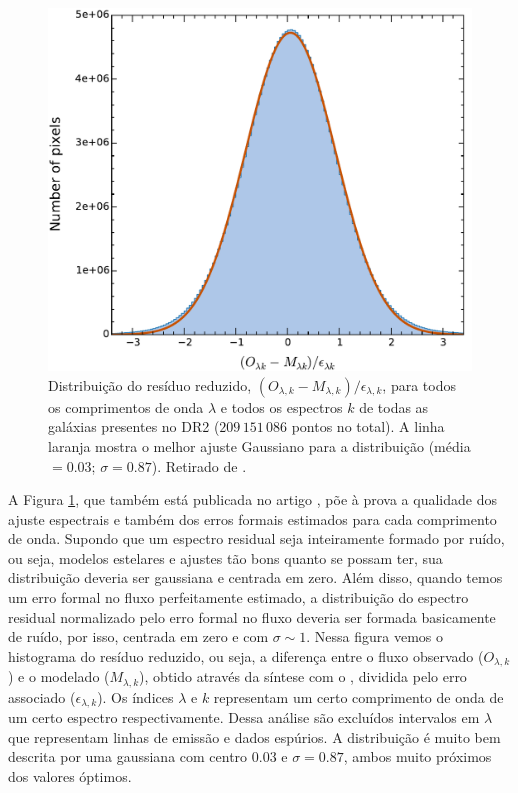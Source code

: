 \begin{figure}
	\centering
	\includegraphics[scale=0.4]{figuras/DR2_hist_error.pdf}
	\caption[Distribuição dos resíduos reduzidos.]
	{Distribuição do resíduo reduzido, $(O_{\lambda,k} - M_{\lambda,k})/\epsilon_{\lambda,k}$, para todos os comprimentos de onda $\lambda$ e todos os espectros $k$ de todas as galáxias presentes no DR2 ($209\,151\,086$ pontos no total). A linha laranja mostra o melhor ajuste Gaussiano para a distribuição (média $= 0.03$; $\sigma = 0.87$). Retirado de \citet{GarciaBenito.etal.2015a}.}
	\label{fig:fres_norm_error_distrib}
\end{figure}

A Figura \ref{fig:fres_norm_error_distrib}, que também está publicada no artigo \citet{GarciaBenito.etal.2015a}, põe à prova a qualidade dos ajuste espectrais e também dos erros formais estimados para cada comprimento de onda. Supondo que um espectro residual seja inteiramente formado por ruído, ou seja, modelos estelares e ajustes tão bons quanto se possam ter, sua distribuição deveria ser gaussiana e centrada em zero. Além disso, quando temos um erro formal no fluxo perfeitamente estimado, a distribuição do espectro residual normalizado pelo erro formal no fluxo deveria ser formada basicamente de ruído, por isso, centrada em zero e com $\sigma \sim 1$. Nessa figura vemos o histograma do resíduo reduzido, ou seja, a diferença entre o fluxo observado ($O_{\lambda,k}$) e o modelado ($M_{\lambda,k}$), obtido através da síntese com o \starlight, dividida pelo erro associado ($\epsilon_{\lambda,k}$). Os índices $\lambda$ e $k$ representam um certo comprimento de onda de um certo espectro respectivamente. Dessa análise são excluídos intervalos em $\lambda$ que representam linhas de emissão e dados espúrios. A distribuição é muito bem descrita por uma gaussiana com centro 0.03 e $\sigma = 0.87$, ambos muito próximos dos valores óptimos.

